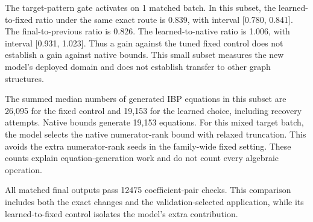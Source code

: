 The target-pattern gate activates on 1 matched batch. In this subset, the learned-to-fixed ratio under the same exact route is 0.839, with interval [0.780, 0.841]. The final-to-previous ratio is 0.826. The learned-to-native ratio is 1.006, with interval [0.931, 1.023]. Thus a gain against the tuned fixed control does not establish a gain against native bounds. This small subset measures the new model's deployed domain and does not establish transfer to other graph structures.

The summed median numbers of generated IBP equations in this subset are 26,095 for the fixed control and 19,153 for the learned choice, including recovery attempts. Native bounds generate 19,153 equations. For this mixed target batch, the model selects the native numerator-rank bound with relaxed truncation. This avoids the extra numerator-rank seeds in the family-wide fixed setting. These counts explain equation-generation work and do not count every algebraic operation.

All matched final outputs pass 12475 coefficient-pair checks. This comparison includes both the exact changes and the validation-selected application, while its learned-to-fixed control isolates the model's extra contribution.

